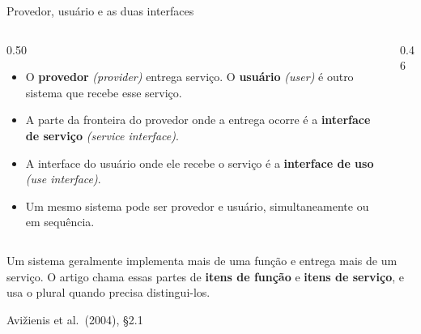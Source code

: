 \documentclass{beamer}
\newcommand{\en}[1]{{\color{depCinza}\textit{#1}}}
\newcommand{\sect}[1]{\par\smallskip\hfill{\tiny\color{black!55}Avi\v{z}ienis et al.\ (2004), #1}}
\begin{document}
\begin{frame}{Provedor, usu\'ario e as duas interfaces}
    \footnotesize
    \begin{columns}[T]
        \begin{column}{0.50\textwidth}
            \begin{itemize}
                \item O \textbf{provedor} \en{(provider)} entrega servi\c{c}o. O \textbf{usu\'ario} \en{(user)} \'e outro sistema que recebe esse servi\c{c}o.
                \item A parte da fronteira do provedor onde a entrega ocorre \'e a \textbf{interface de servi\c{c}o} \en{(service interface)}.
                \item A interface do usu\'ario onde ele recebe o servi\c{c}o \'e a \textbf{interface de uso} \en{(use interface)}.
                \item Um mesmo sistema pode ser provedor e usu\'ario, simultaneamente ou em sequ\^encia.
            \end{itemize}
        \end{column}
        \begin{column}{0.46\textwidth}
            \centering
        \end{column}
    \end{columns}
    \medskip
    \begin{pratica}
        \scriptsize
        Um sistema geralmente implementa mais de uma fun\c{c}\~ao e entrega mais de um servi\c{c}o. O artigo chama essas partes de \textbf{itens de fun\c{c}\~ao} e \textbf{itens de servi\c{c}o}, e usa o plural quando precisa distingui-los.
    \end{pratica}
    \sect{\S2.1}
\end{frame}
\end{document}
